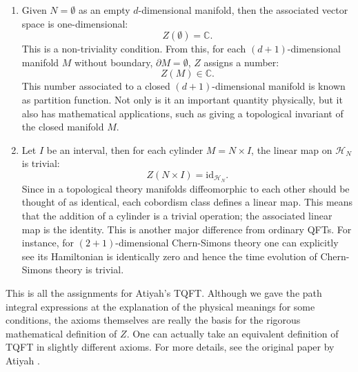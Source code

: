 \begin{enumerate}
  \item Given $N=\emptyset$ as an empty $d$-dimensional manifold, then the
associated vector space is one-dimensional:
\begin{equation}
  Z(\emptyset)  =  \mathbb{C}.
\end{equation}
This is a non-triviality condition. From this, for each $(d+1)$-dimensional
manifold $M$ without boundary, $\partial M=\emptyset$, $Z$ assigns
a number:
\begin{equation}
  Z(M)  \in  \mathbb{C}.
\end{equation}
This number associated to a closed $(d+1)$-dimensional manifold
is known as partition function. Not only is it an important quantity
physically, but it also has mathematical applications, such as giving
a topological invariant of the closed manifold $M$.
\item Let $I$ be an interval, then for each cylinder $M=N\times I$, the
linear map on $\mathcal{H}_{N}$ is trivial:
\begin{equation}
  Z(N\times I)  =  \mathrm{id}_{\mathcal{H}_{N}}.
\end{equation}
Since in a topological theory manifolds diffeomorphic to each other
should be thought of as identical, each cobordism class defines
a linear map. This means that the addition of a cylinder is a trivial
operation; the associated linear map is the identity. This
is another major difference from ordinary QFTs. For instance, for $(2+1)$-dimensional
Chern-Simons theory one can explicitly see its Hamiltonian is identically
zero and hence the time evolution of Chern-Simons theory is trivial.
\end{enumerate}
%
This is all the assignments for Atiyah's TQFT. Although we gave the
path integral expressions at the explanation of the physical meanings
for some conditions, the axioms themselves are really the basis for
the rigorous mathematical definition of $Z$. One can actually take
an equivalent definition of TQFT in slightly different axioms. For
more details, see the original paper by Atiyah \cite{Atiyah:1989vu}.

